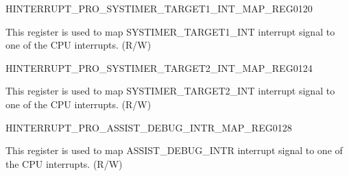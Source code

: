 \begin{register}{H}{INTERRUPT\_PRO\_SYSTIMER\_TARGET1\_INT\_MAP\_REG}{\hexprefix{}0120}\label{regdesc:INTERRUPTPROSYSTIMERTARGET1INTMAPREG}
%
%
\regnewline%
\begin{regdesc}\begin{reglist}
\label{fielddesc:INTERRUPTPROSYSTIMERTARGET1INTMAP}\item [INTERRUPT\_PRO\_SYSTIMER\_TARGET1\_INT\_MAP] This register is used to map SYSTIMER\_TARGET1\_INT interrupt signal to one of the CPU interrupts. (R/W)
\end{reglist}\end{regdesc}
\end{register}


\begin{register}{H}{INTERRUPT\_PRO\_SYSTIMER\_TARGET2\_INT\_MAP\_REG}{\hexprefix{}0124}\label{regdesc:INTERRUPTPROSYSTIMERTARGET2INTMAPREG}
%
%
\regnewline%
\begin{regdesc}\begin{reglist}
\label{fielddesc:INTERRUPTPROSYSTIMERTARGET2INTMAP}\item [INTERRUPT\_PRO\_SYSTIMER\_TARGET2\_INT\_MAP] This register is used to map SYSTIMER\_TARGET2\_INT interrupt signal to one of the CPU interrupts. (R/W)
\end{reglist}\end{regdesc}
\end{register}


\begin{register}{H}{INTERRUPT\_PRO\_ASSIST\_DEBUG\_INTR\_MAP\_REG}{\hexprefix{}0128}\label{regdesc:INTERRUPTPROASSISTDEBUGINTRMAPREG}
%
%
\regnewline%
\begin{regdesc}\begin{reglist}
\label{fielddesc:INTERRUPTPROASSISTDEBUGINTRMAP}\item [INTERRUPT\_PRO\_ASSIST\_DEBUG\_INTR\_MAP] This register is used to map ASSIST\_DEBUG\_INTR interrupt signal to one of the CPU interrupts. (R/W)
\end{reglist}\end{regdesc}
\end{register}


